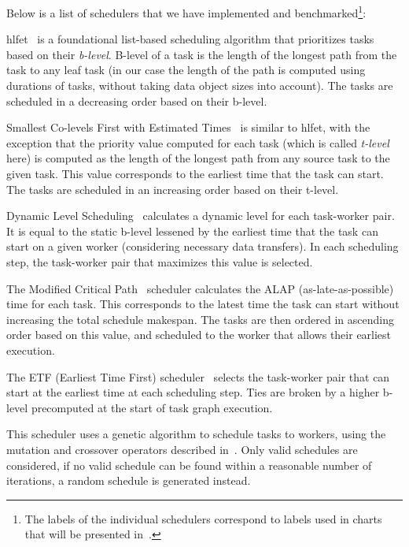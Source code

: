 Below is a list of schedulers that we have implemented and benchmarked\footnote{The labels of the individual schedulers correspond to labels used in charts that will be presented
in~.}:

\begin{description}[wide=0pt]
	\item[blevel] \gls{hlfet}~\cite{hlfet1974} is a
	foundational list-based scheduling algorithm that prioritizes tasks based on their
	\emph{b-level}. B-level of a task is the length of the longest path from the task to any
	leaf task (in our case the length of the path is computed using durations of tasks, without taking
	data object sizes into account). The tasks are scheduled in a decreasing order based on their
	b-level.

	\item[tlevel]
	Smallest Co-levels First with Estimated Times~\cite{kwok1999static} is similar to
	\gls{hlfet}, with the exception that the priority value computed for each task (which
	is called \emph{t-level} here) is computed as the length of the longest path from any
	source task to the given task. This value corresponds to the earliest time that the task can start.
	The tasks are scheduled in an increasing order based on their t-level.

	\item[dls]
	Dynamic Level Scheduling~\cite{sih1993compile} calculates a dynamic level for each task-worker
	pair. It is equal to the static b-level lessened by the earliest time that the task can start on a
	given worker (considering necessary data transfers). In each scheduling step, the task-worker pair
	that maximizes this value is selected.

	\item[mcp]
	The Modified Critical Path~\cite{wu1990hypertool} scheduler calculates the ALAP
	(as-late-as-possible) time for each task. This corresponds to the latest time the task can start
	without increasing the total schedule makespan. The tasks are then ordered in ascending order based
	on this value, and scheduled to the worker that allows their earliest execution.

	\item[etf]
	The ETF (Earliest Time First) scheduler~\cite{hwang1989scheduling} selects the task-worker pair that
	can start at the earliest time at each scheduling step. Ties are broken by a higher b-level
	precomputed at the start of task graph execution.

	\item[genetic]
	This scheduler uses a genetic algorithm to schedule tasks to workers, using the mutation and
	crossover operators described in~\cite{omara2009genetic}. Only valid schedules are considered, if
	no valid schedule can be found within a reasonable number of iterations, a random schedule is
	generated instead.


\end{description}
